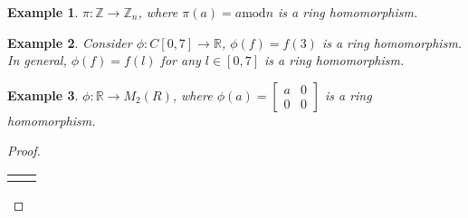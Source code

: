 \documentclass{article}
\theoremstyle{MyNonumberplain}
\theoremstyle{break}
\newtheorem*{proof}{Proof. }
\newcommand{\nline}{\begin{tabular}{ll}&\\\end{tabular}}
\newcommand{\tmop}{\text}
\theoremstyle{break}
\newtheorem{example}{Example}[section]
\theoremstyle{break}
\theoremstyle{definition}
\theoremstyle{break}
\begin{document}
\begin{expbox}
    \begin{example}
        $\pi : \mathbb{Z} \rightarrow \mathbb{Z}_n$, where $\pi (a) = a \tmop{mod} n$
        is a ring homomorphism.
    \end{example}
\end{expbox}

\begin{expbox}
    \begin{example}
        Consider $\phi : C [0, 7] \rightarrow \mathbb{R}$, $\phi (f) = f (3)$ is a
        ring homomorphism. In general, $\phi (f) = f (l)$ for any $l \in [0, 7]$ is a
        ring homomorphism.
    \end{example}
\end{expbox}

\begin{expbox}
    \begin{example}
        $\phi : \mathbb{R} \rightarrow M_2 (R)$, where $\phi (a) =
        \left[\begin{array}{cc}
          a & 0\\
          0 & 0
        \end{array}\right]$ is a ring homomorphism.
    \end{example}
    \begin{prfbox}
        \begin{proof}

            \nline


\end{proof}
\end{prfbox}
\end{expbox}
\end{document}

